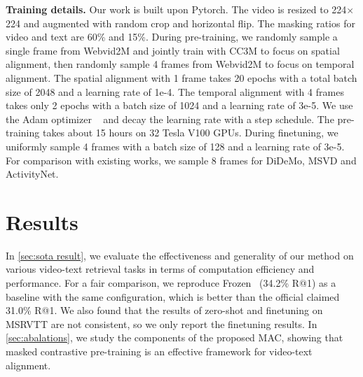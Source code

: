 \documentclass[10pt,twocolumn,letterpaper]{article}
\begin{document}
\vspace{1mm}\noindent\textbf{Training details.} Our work is built upon Pytorch. The video is resized to 224$\times$224 and augmented with random crop and horizontal flip. The masking ratios for video and text are 60\% and 15\%. During pre-training, we randomly sample a single frame from Webvid2M and jointly train with CC3M to focus on spatial alignment, then randomly sample 4 frames from Webvid2M to focus on temporal alignment. The spatial alignment with 1 frame takes 20 epochs with a total batch size of 2048 and a learning rate of 1$\mathrm{e}$-4. The temporal alignment with 4 frames takes only 2 epochs with a batch size of 1024 and a learning rate of 3$\mathrm{e}$-5. We use the Adam optimizer ~\cite{adam} and decay the learning rate with a step schedule. The pre-training takes about 15 hours on 32 Tesla V100 GPUs. During finetuning, we uniformly sample 4 frames with a batch size of 128 and a learning rate of 3$\mathrm{e}$-5. For comparison with existing works, we sample 8 frames for DiDeMo, MSVD and ActivityNet.



\vspace{-1mm}\section{Results}
In \cref{sec:sota result}, we evaluate the effectiveness and generality of our method on various video-text retrieval tasks in terms of computation efficiency and performance. For a fair comparison, we reproduce Frozen ~\cite{Frozen}(34.2\% R@1) as a baseline with the same configuration, which is better than the official claimed 31.0\% R@1. We also found that the results of zero-shot and finetuning on MSRVTT are not consistent, so we only report the finetuning results. In \cref{sec:abalations}, we study the components of the proposed MAC, showing that masked contrastive pre-training is an effective framework for video-text alignment.  
\end{document}
